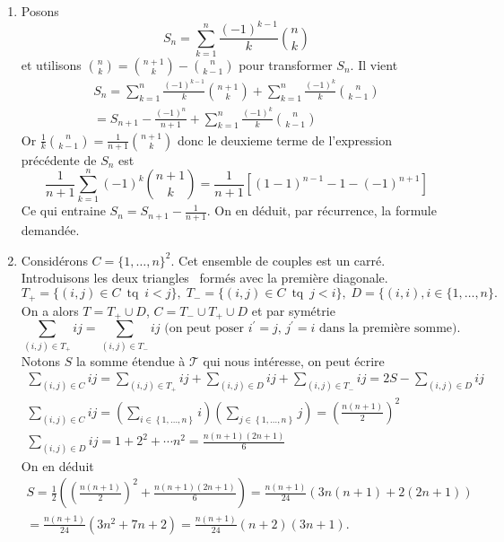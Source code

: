 \begin{enumerate}
 \item Posons
$$S_n=\sum_{k=1}^n\frac{(-1)^{k-1}}{k}\binom{n}{k}$$
et utilisons $\binom{n}{k}= \binom{n+1}{k} - \binom{n}{k-1} $ pour transformer $S_n$. Il vient
\begin{eqnarray*}
S_n=\sum_{k=1}^{n}\frac{(-1)^{k-1}}{k}\binom{n+1}{k}
    +\sum_{k=1}^n\frac{(-1)^k}{k}\binom{n}{k-1}\\
=S_{n+1}-\frac{(-1)^n}{n+1}+\sum_{k=1}^n\frac{(-1)^k}{k}\binom{n}{k-1}
\end{eqnarray*}
Or $\frac{1}{k}\binom{n}{k-1}=\frac{1}{n+1}\binom{n+1}{k}$ donc le deuxieme terme de l'expression pr{\'e}c{\'e}dente de $S_n$ est
\begin{displaymath}
\frac{1}{n+1}\sum_{k=1}^n (-1)^k \binom{n+1}{k}=
\frac{1}{n+1} \left[ (1-1)^{n-1}-1-(-1)^{n+1}\right]
\end{displaymath}
Ce qui entraine $S_n=S_{n+1}-\frac{1}{n+1}$. On en d{\'e}duit, par récurrence, la formule demand{\'e}e.

\item
Consid{\'e}rons $C=\{ 1,\ldots ,n \} ^{2}$. Cet ensemble de couples est un \og carré\fg. Introduisons les deux \og triangles\fg~ formés avec la première \og diagonale\fg.
\[
T_{+} = \{(i,j)\in C \, \text{ tq } \, i<j\},\;
T_{-} = \{(i,j)\in C \, \text{ tq } \, j<i\},\;
D = \{(i,i),i\in \{ 1,\ldots ,n \}. 
\]
On a alors $T=T_{+}\cup D$, $C=T_{-}\cup T_{+}\cup D$ et par symétrie
\[
\sum_{(i,j)\in T_{+}}ij=\sum_{(i,j)\in T_{-}}ij \text{ (on peut poser $i^{\prime }=j$, $j^{\prime}=i$ dans la premi{\`e}re somme)}. 
\]
Notons $S$ la somme étendue à $\mathcal{T}$ qui nous int{\'e}resse, on peut {\'e}crire
\begin{eqnarray*}
\sum_{(i,j)\in C}ij = \sum_{(i,j)\in T_{+}}ij+\sum_{(i,j)\in D}ij + \sum_{(i,j)\in T_{-}}ij = 2S - \sum_{(i,j)\in D}ij \\
\sum_{(i,j)\in C}ij = \left( \sum_{i\in \left\{ 1,\ldots ,n\right\} }i\right) \left( \sum_{j\in \left\{ 1,\ldots ,n\right\} }j\right) =\left( \frac{n(n+1)}{2}\right) ^{2} \\
\sum_{(i,j)\in D}ij = 1+2^{2}+\cdots n^{2} = \frac{n(n+1)(2n+1)}{6}
\end{eqnarray*}
On en d{\'e}duit
\begin{multline*}
S = \frac{1}{2}\left( \left( \frac{n(n+1)}{2}\right) ^{2} + \frac{n(n+1)(2n+1)}{6}\right)
= \frac{n(n+1)}{24}\left( 3n(n+1) + 2(2n+1)\right) \\
= \frac{n(n+1)}{24}\left( 3n^2 + 7n + 2\right) 
= \frac{n(n+1)}{24}(n+2)(3n+1).
\end{multline*}


\end{enumerate}
